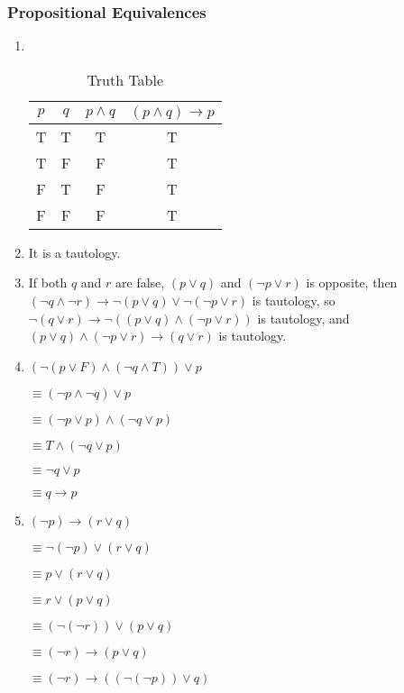 \documentclass{sig-alternate-05-2015}
\begin{document}
\subsubsection{Propositional Equivalences}
\begin{enumerate}
\item {\ }
\begin{table}[htb]
	\centering
	\caption{Truth Table}
	\begin{tabular}{cccc} \toprule
		$p$ & $q$ & $p \wedge q$ & $(p \wedge q) \rightarrow p$\\ \midrule
		T & T & T & T\\ 
		T & F & F & T\\
		F & T & F & T\\
		F & F & F & T\\
		\hline\end{tabular}
\end{table}


\item It is a tautology.

\item If both $q$ and $r$ are false, $(p \vee q)$ and $(\neg p \vee r)$ is opposite, then $(\neg q \wedge \neg r) \rightarrow \neg (p \vee q) \vee \neg (\neg p \vee r)$ is tautology, so $\neg(q \vee r) \rightarrow \neg ((p \vee q) \wedge (\neg p \vee r))$ is tautology, and $(p \vee q) \wedge (\neg p \vee r) \rightarrow (q \vee r)$ is tautology.

\item  $(\neg(p \vee F) \wedge (\neg q \wedge T)) \vee p$

$\equiv (\neg p \wedge \neg q)\vee p$

$\equiv (\neg p\vee p) \wedge (\neg q \vee p)$

 $\equiv T \wedge (\neg q \vee p)$

 $\equiv \neg q \vee p$
  
  $\equiv  q \rightarrow p$
 
 \item $ (\neg p) \rightarrow (r\vee q)$
 
 $\equiv  \neg(\neg p) \vee (r\vee q)$

$\equiv  p \vee (r\vee q)$

$\equiv  r \vee (p\vee q)$

$\equiv  (\neg(\neg r)) \vee (p\vee q)$

$\equiv  (\neg r)\rightarrow (p\vee q)$

$\equiv  (\neg r)\rightarrow ((\neg(\neg p))\vee q)$


\end{enumerate}
\end{document}
